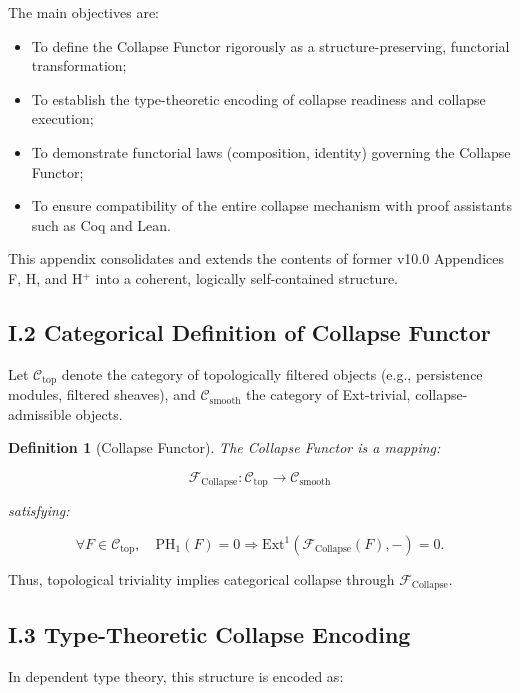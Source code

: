 \documentclass[11pt]{article}
\newtheorem{definition}[theorem]{Definition}
\begin{document}
The main objectives are:

\begin{itemize}
    \item To define the Collapse Functor rigorously as a structure-preserving, functorial transformation;
    \item To establish the type-theoretic encoding of collapse readiness and collapse execution;
    \item To demonstrate functorial laws (composition, identity) governing the Collapse Functor;
    \item To ensure compatibility of the entire collapse mechanism with proof assistants such as Coq and Lean.
\end{itemize}

This appendix consolidates and extends the contents of former v10.0 Appendices F, H, and H$^+$ into a coherent, logically self-contained structure.

\subsection*{I.2 Categorical Definition of Collapse Functor}

Let \( \mathcal{C}_{\mathrm{top}} \) denote the category of topologically filtered objects (e.g., persistence modules, filtered sheaves), and \( \mathcal{C}_{\mathrm{smooth}} \) the category of Ext-trivial, collapse-admissible objects.

\begin{definition}[Collapse Functor]
The \emph{Collapse Functor} is a mapping:

\[
\mathcal{F}_{\mathrm{Collapse}} : \mathcal{C}_{\mathrm{top}} \to \mathcal{C}_{\mathrm{smooth}}
\]

satisfying:

\[
\forall F \in \mathcal{C}_{\mathrm{top}}, \quad \mathrm{PH}_1(F) = 0 \Rightarrow \mathrm{Ext}^1(\mathcal{F}_{\mathrm{Collapse}}(F), -) = 0.
\]
\end{definition}

Thus, topological triviality implies categorical collapse through \( \mathcal{F}_{\mathrm{Collapse}} \).

\subsection*{I.3 Type-Theoretic Collapse Encoding}

In dependent type theory, this structure is encoded as:
\end{document}
